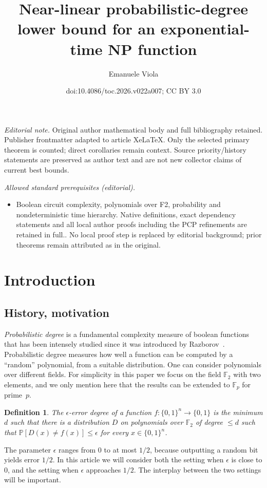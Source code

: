 \documentclass[11pt]{article}
\title{Near-linear probabilistic-degree lower bound for an exponential-time NP function}
\author{Emanuele Viola}
\date{doi:10.4086/toc.2026.v022a007; CC BY 3.0}
\newtheorem{defn}[theorem]{Definition}
\newcommand{\zo}{\{0, 1\}}
\newcommand{\F}{\mathbb{F}}
\renewcommand{\P}{\mathbb{P}}
\newcommand{\eps}{\epsilon}
\newcommand{\e}{\epsilon}
\begin{document}
\maketitle
\noindent\textit{Editorial note.} Original author mathematical body and full bibliography retained. Publisher frontmatter adapted to article XeLaTeX. Only the selected primary theorem is counted; direct corollaries remain context. Source priority/history statements are preserved as author text and are not new collector claims of current best bounds.\par\medskip
\noindent\textit{Allowed standard prerequisites (editorial).}\begin{itemize}
\item Boolean circuit complexity, polynomials over F2, probability and nondeterministic time hierarchy. Native definitions, exact dependency statements and all local author proofs including the PCP refinements are retained in full.. No local proof step is replaced by editorial background; prior theorems remain attributed as in the original.
\end{itemize}\medskip
\section{Introduction}
%
%
%
%

%
%
%
\subsection{History, motivation}  %
\label{preamble}                  %

\emph{Probabilistic degree} is a fundamental complexity measure of
boolean functions that has been intensely studied since it was introduced
by Razborov~\cite{Raz87}. Probabilistic degree measures how well
a function can be computed by a ``random'' polynomial, from a suitable
distribution. One can consider polynomials over different fields.
For simplicity in this paper we focus on the field $\F_{2}$ with
two elements, and we only mention here that the results can be extended
to $\F_{p}$ for prime~$p$.

\begin{defn}
The \emph{$\e$-error degree} of a function $f:\zo^{n}\to\zo$ is
the minimum $d$ such that there is a distribution $D$ on polynomials
over $\F_{2}$ of degree $\le d$ such that
$\P[D(x) \ne f(x)] \le \eps$
for every $x\in\zo^{n}$.
\end{defn}

The parameter $\e$ ranges from $0$ to at most $1/2$, because outputting
a random bit yields error $1/2$. In this %
article  %
we will consider both
the setting when $\e$ is close to $0$, and the setting when $\e$
approaches $1/2$. The interplay between the two settings will be
important.
\end{document}
